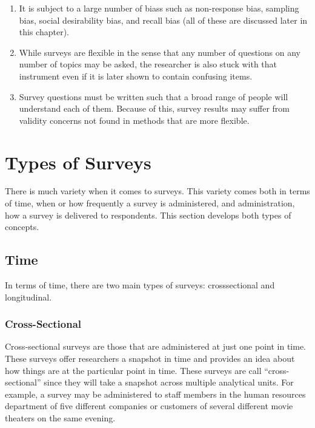 \begin{enumerate}
	\item It is subject to a large number of \glspl{bias} such as non-response bias, sampling bias, social desirability bias, and recall bias (all of these are discussed later in this chapter).
	
	\item While surveys are flexible in the sense that any number of questions on any number of topics may be asked, the researcher is also stuck with that instrument even if it is later shown to contain confusing items. 
	
	\item Survey questions must be written such that a broad range of people will understand each of them. Because of this, survey results may suffer from \gls{validity} concerns not found in methods that are more flexible. 
\end{enumerate}

\section{Types of Surveys}

There is much variety when it comes to surveys. This variety comes both in terms of time, \ie\: when or how frequently a survey is administered, and administration, \ie\: how a survey is delivered to respondents. This section develops both types of concepts.

\subsection{Time}

In terms of time, there are two main types of surveys: \gls{crosssectional} and \gls{longitudinal}.

\subsubsection{Cross-Sectional}

Cross-sectional surveys are those that are administered at just one point in time. These surveys offer researchers a snapshot in time and provides an idea about how things are at the particular point in time. These surveys are call ``cross-sectional'' since they will take a snapshot across multiple analytical units. For example, a survey may be administered to staff members in the human resources department of five different companies or customers of several different movie theaters on the same evening. 

